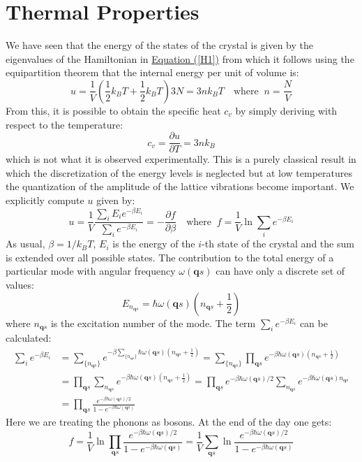 \documentclass[10.75pt,a4paper,openright,bottom=2cm]{article}
\renewcommand{\Vec}[1]{\boldsymbol{#1}}
\begin{document}
\section{Thermal Properties}
We have seen that the energy of the states of the crystal is given by the eigenvalues of the Hamiltonian in \hyperref[H1]{Equation (\ref{H1})} from which it follows using the equipartition theorem that the internal energy per unit of volume is:
\[
u=\frac{1}{V}\left(\frac{1}{2}k_BT+\frac{1}{2}k_BT\right)3N=3nk_BT \quad \text{where}\;\;n=\frac{N}{V}
\]
From this, it is possible to obtain the specific heat $c_v$ by simply deriving with respect to the temperature:
\[
c_v=\frac{\partial u}{\partial T}=3nk_B
\]
which is not what it is observed experimentally. This is a purely classical result in which the discretization of the energy levels is neglected but at low temperatures the quantization of the amplitude of the lattice vibrations become important. We explicitly compute $u$ given by:
\[
u=\frac{1}{V}\frac{\sum_iE_ie^{-\beta E_i}}{\sum_ie^{-\beta E_i}}=-\frac{\partial f}{\partial\beta} \quad \text{where}\;\;f=\frac{1}{V}\ln{\sum_ie^{-\beta E_i}}
\]
As usual, $\beta=1/k_BT$, $E_i$ is the energy of the $i$-th state of the crystal and the sum is extended over all possible states. The contribution to the total energy of a particular mode with angular frequency $\omega(\Vec{q}s)$ can have only a discrete set of values:
\[
E_{n_{\Vec{q}s}}=\hbar\omega(\Vec{q}s)\left(n_{\Vec{q}s}+\frac{1}{2}\right)
\]
where $n_{\Vec{q}s}$ is the excitation number of the mode. The term $\sum_ie^{-\beta E_i}$ can be calculated:
\begin{align*}
\sum_ie^{-\beta E_i}&=\sum_{\{n_{\Vec{q}s}\}}e^{-\beta\sum_{\{n_{\Vec{q}s}\}}\hbar\omega(\Vec{q}s)\left(n_{\Vec{q}s}+\frac{1}{2}\right)}=\sum_{\{n_{\Vec{q}s}\}}\prod_{\Vec{q}s}e^{-\beta\hbar\omega(\Vec{q}s)\left(n_{\Vec{q}s}+\frac{1}{2}\right)}\\
&=\prod_{\Vec{q}s}\sum_{n_{\Vec{q}s}}e^{-\beta\hbar\omega(\Vec{q}s)\left(n_{\Vec{q}s}+\frac{1}{2}\right)}=\prod_{\Vec{q}s}e^{-\beta\hbar\omega(\Vec{q}s)/2}\sum_{n_{\Vec{q}s}}e^{-\beta\hbar\omega(\Vec{q}s)n_{\Vec{q}s}}\\
&=\prod_{\Vec{q}s}\frac{e^{-\beta\hbar\omega(\Vec{q}s)/2}}{1-e^{-\beta\hbar\omega(\Vec{q}s)}}
\end{align*}
Here we are treating the phonons as bosons. At the end of the day one gets:
\[
f=\frac{1}{V}\ln{\prod_{\Vec{q}s}\frac{e^{-\beta\hbar\omega(\Vec{q}s)/2}}{1-e^{-\beta\hbar\omega(\Vec{q}s)}}}=\frac{1}{V}\sum_{\Vec{q}s}\ln{\frac{e^{-\beta\hbar\omega(\Vec{q}s)/2}}{1-e^{-\beta\hbar\omega(\Vec{q}s)}}}
\]
\end{document}
